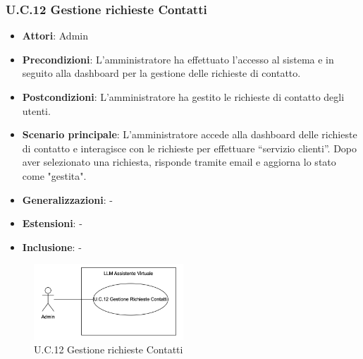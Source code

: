 \subsubsection{U.C.12 Gestione richieste Contatti}
\begin{itemize}
    \item \textbf{Attori}: Admin
    \item \textbf{Precondizioni}: L’amministratore ha effettuato l’accesso al sistema e in seguito alla dashboard per la gestione delle richieste di contatto.
    \item \textbf{Postcondizioni}: L’amministratore ha gestito le richieste di contatto degli utenti.
    \item \textbf{Scenario principale}: L’amministratore accede alla dashboard delle richieste di contatto e interagisce con le richieste per effettuare “servizio clienti”. Dopo aver selezionato una richiesta, risponde tramite email e aggiorna lo stato come "gestita".
    \item \textbf{Generalizzazioni}: -
    \item \textbf{Estensioni}: -
    \item \textbf{Inclusione}: -
\end{itemize}
\begin{figure}[H]
    \centering
    \includegraphics[width=0.5\textwidth]{img/UC12.png}
    \caption{U.C.12 Gestione richieste Contatti}
\end{figure}
